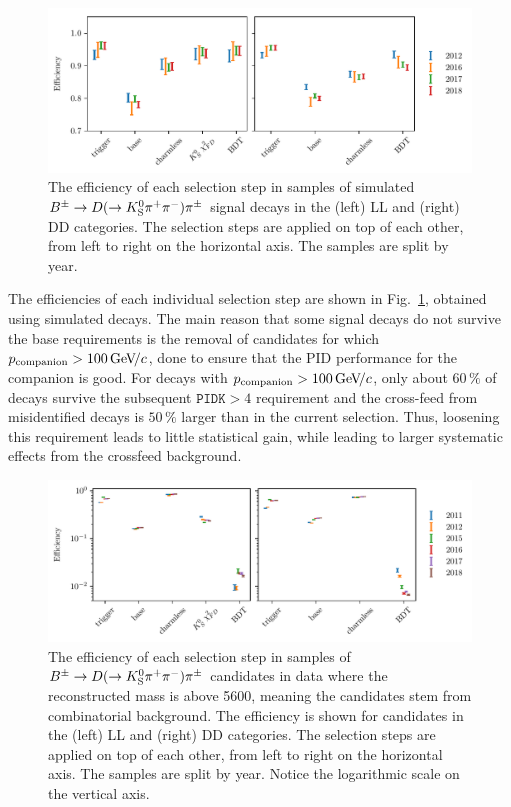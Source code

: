 \begin{figure}[tp]
    \centering
    \includegraphics[width=0.98\columnwidth]{figures/analysis//relative_cutflow_signal_thesis.pdf}
    \caption{The efficiency of each selection step in samples of simulated ${{{B}^\pm}\rightarrow{\ensuremath{D}}(\rightarrow{\ensuremath{{K}^0_{\mathrm{S}}}}{\ensuremath{{\pi}^+}}{\ensuremath{{\pi}^-}}){{\pi}^\pm}}$ signal decays in the (left) LL and (right) DD categories. The selection steps are applied on top of each other, from left to right on the horizontal axis. The samples are split by year. }
    \label{fig:sig_rel_cutflow}
\end{figure}



The efficiencies of each individual selection step are shown in Fig.~\ref{fig:sig_rel_cutflow}, obtained using simulated \BtoDpi decays. The main reason that some signal decays do not survive the base requirements is the removal of candidates for which ${p_\mathrm{companion}>100\text{\,Ge\kern -0.1em V\!/}c}$, done to ensure that the PID performance for the companion is good. For decays with $p_\mathrm{companion}>100\text{\,Ge\kern -0.1em V\!/}c$, only about $60\,\%$ of \BtoDK decays survive the subsequent $\texttt{PIDK}>4$ requirement and the cross-feed from misidentified \BtoDpi decays is $50\,\%$ larger than in the current selection. Thus, loosening this requirement leads to little statistical gain, while leading to larger systematic effects from the crossfeed background.


\begin{figure}[tp]
    \centering
    \includegraphics[width=0.98\columnwidth]{figures/analysis/relative_cutflow_combinatorial_thesis.pdf}
    \caption{
    The efficiency of each selection step in samples of ${{{B}^\pm}\rightarrow{\ensuremath{D}}(\rightarrow{\ensuremath{{K}^0_{\mathrm{S}}}}{\ensuremath{{\pi}^+}}{\ensuremath{{\pi}^-}}){{\pi}^\pm}}$ candidates in data where the reconstructed \B mass is above 5600\mevcc, meaning the candidates stem from combinatorial background. The efficiency is shown for candidates in the (left) LL and (right) DD categories. The selection steps are applied on top of each other, from left to right on the horizontal axis. The samples are split by year. Notice the logarithmic scale on the vertical axis.}
    \label{fig:comb_rel_cutflow}
\end{figure}

